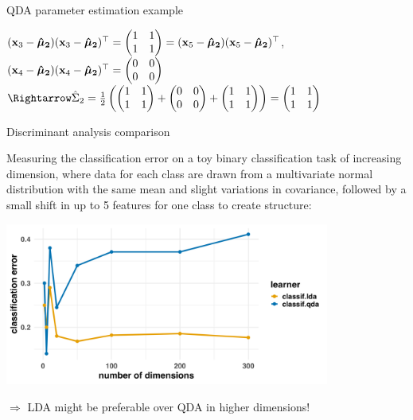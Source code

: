 \documentclass[11pt,compress,t,notes=noshow, xcolor=table]{beamer}
\begin{document}
\begin{vbframe}{QDA parameter estimation example}
\begin{small}
$(\xv_3 - \mukh[2])(\xv_3 - \mukh[2])^\top = \begin{pmatrix} 1 & 1 \\ 1 & 1 \end{pmatrix} = (\xv_5 - \mukh[2])(\xv_5 - \mukh[2])^\top$, $(\xv_4 - \mukh[2])(\xv_4 - \mukh[2])^\top = \begin{pmatrix} 0 & 0 \\ 0 & 0 \end{pmatrix}$\\
$\Rightarrow \Sigmah_2 = \frac{1}{2} \left( \begin{pmatrix} 1 & 1 \\ 1 & 1 \end{pmatrix} + \begin{pmatrix} 0 & 0 \\ 0 & 0 \end{pmatrix} + \begin{pmatrix} 1 & 1 \\ 1 & 1 \end{pmatrix} \right) = \begin{pmatrix} 1 & 1 \\ 1 & 1 \end{pmatrix}$
\end{small}
\end{vbframe}


\begin{vbframe}{Discriminant analysis comparison}
\begin{small}
Measuring the classification error on a toy binary classification task of increasing dimension, where data for each class are drawn from a multivariate normal distribution with the same mean and slight variations in covariance, followed by a small shift in up to 5 features for one class to create structure:
\end{small}

\begin{center}
\includegraphics[width=0.8\textwidth, clip=true, trim={0 0 0 0}]{figure/disc_cod.png}
\end{center}

$\Rightarrow$ LDA might be preferable over QDA in higher dimensions!

\end{vbframe}
\endlecture
\end{document}
